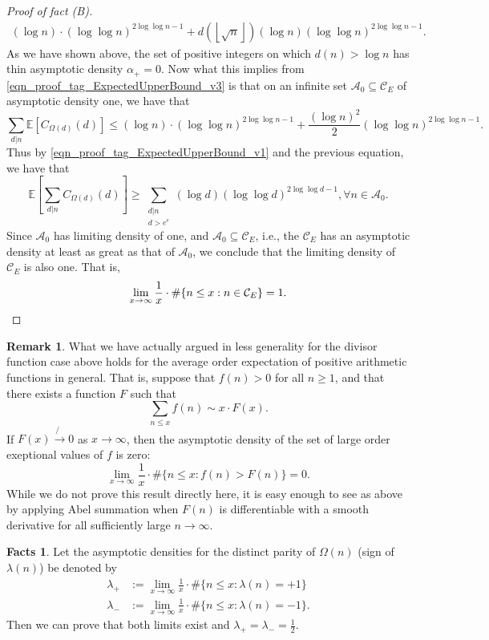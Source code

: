 \documentclass[11pt,reqno,a4letter]{article}
\numberwithin{figure}{section}
\numberwithin{table}{section}
\newcommand{\floor}[1]{\left\lfloor #1 \right\rfloor}
\theoremstyle{plain}
\numberwithin{theorem}{section}
\theoremstyle{definition}
\newtheorem{remark}[theorem]{Remark}
\newtheorem{facts}[theorem]{Facts}
\begin{document}
\begin{proof}[Proof of fact (B)]
\begin{align}
     (\log n) \cdot (\log\log n)^{2\log\log n - 1} + 
     d(\floor{\sqrt{n}}) (\log n) (\log\log n)^{2\log\log n - 1}. 
\end{align} 
As we have shown above, the set of positive integers on which $d(n) > \log n$ has thin 
asymptotic density $\alpha_{+} = 0$. 
Now what this implies from \eqref{eqn_proof_tag_ExpectedUpperBound_v3} 
is that on an infinite set $\mathcal{A}_0 \subseteq \mathcal{C}_E$ of asymptotic density one, 
we have that 
\[
\sum_{d|n} \mathbb{E}[C_{\Omega(d)}(d)] \leq (\log n) \cdot (\log\log n)^{2\log\log n - 1} + 
     \frac{(\log n)^2}{2} (\log\log n)^{2\log\log n - 1}. 
\]
Thus by \eqref{eqn_proof_tag_ExpectedUpperBound_v1} and the previous equation, we have that 
\[
\mathbb{E}\left[\sum_{d|n} C_{\Omega(d)}(d)\right] \geq 
     \sum_{\substack{d|n \\ d > e^e}} (\log d) (\log\log d)^{2 \log\log d - 1}, 
     \forall n \in \mathcal{A}_0. 
\]
Since $\mathcal{A}_0$ has limiting density of one, and $\mathcal{A}_0 \subseteq \mathcal{C}_E$, i.e., 
the $\mathcal{C}_E$ has an asymptotic density at least as great as that of $\mathcal{A}_0$, 
we conclude that the limiting density of $\mathcal{C}_E$ is also one. 
That is, 
\[
\lim_{x \rightarrow \infty} \frac{1}{x} \cdot \#\{n \leq x: n \in \mathcal{C}_E\} = 1. 
     \qedhere 
\]
\end{proof}  

\begin{remark} 
\label{remark_AsymptoticDensitiesOfExceptionalSets_v1} 
What we have actually argued in less generality for the divisor function case above holds for 
the average order expectation of positive arithmetic functions in general. That is, 
suppose that $f(n) > 0$ for all $n \geq 1$, and that there exists a function $F$ such that 
\[
\sum_{n \leq x} f(n) \sim x \cdot F(x). 
\]
If $F(x) \not{\rightarrow} 0$ as $x \rightarrow \infty$, then the asymptotic density of the set of 
large order exeptional values of $f$ is zero: 
\[
\lim_{x \rightarrow \infty} \frac{1}{x} \cdot \#\{n \leq x: f(n) > F(n)\} = 0. 
\]
While we do not prove this result directly here, it is easy enough to see as above by 
applying Abel summation when $F(n)$ is differentiable with a smooth 
derivative for all sufficiently large $n \rightarrow \infty$. 
\end{remark} 

\begin{facts} 
\label{lemma_AsymptoticDensitiesParityOmegan_v1} 
Let the asymptotic densities for the distinct parity of $\Omega(n)$ (sign of $\lambda(n)$) 
be denoted by 
\begin{align*} 
\lambda_{+} & := \lim_{x \rightarrow \infty} \frac{1}{x} \cdot \#\{n \leq x: \lambda(n) = +1\} \\ 
\lambda_{-} & := \lim_{x \rightarrow \infty} \frac{1}{x} \cdot \#\{n \leq x: \lambda(n) = -1\}. 
\end{align*} 
Then we can prove that both limits exist and $\lambda_{+} = \lambda_{-} = \frac{1}{2}$. 
\end{facts} 
\end{document}
